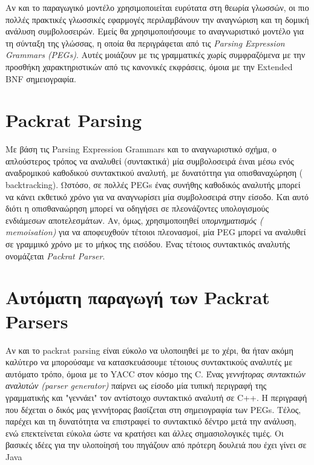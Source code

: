 \documentclass[diploma]{softlab-thesis}
\begin{document}
  Αν και το παραγωγικό μοντέλο χρησιμοποιείται ευρύτατα στη θεωρία γλωσσών, οι πιο πολλές πρακτικές γλωσσικές εφαρμογές περιλαμβάνουν την αναγνώριση και τη δομική ανάλυση συμβολοσειρών. 
Εμείς θα χρησιμοποιήσουμε το αναγνωριστικό μοντέλο για τη σύνταξη της γλώσσας, η οποία θα περιγράφεται από τις  \textit{Parsing Expression Grammars (PEGs)}. Αυτές μοιάζουν με τις γραμματικές χωρίς συμφραζόμενα με την προσθήκη χαρακτηριστικών από τις κανονικές εκφράσεις, όμοια με την  Extended BNF σημειογραφία.

\section{ Packrat Parsing}
Με βάση τις Parsing Expression Grammars και το αναγνωριστικό σχήμα, ο απλούστερος τρόπος να αναλυθεί (συντακτικά) μία συμβολοσειρά έιναι μέσω ενός αναδρομικού καθοδικού συντακτικού αναλυτή, με δυνατόττηα για οπισθαναχώρηση ( backtracking). 
Ωστόσο, σε πολλές  PEGs  ένας συνήθης καθοδικός αναλυτής μπορεί να κάνει εκθετικό χρόνο για να αναγνωρίσει μία συμβολοσειρά στην είσοδο. 
Και αυτό διότι η οπισθαναώρηση μπορεί να οδηγήσει σε πλεονάζοντες υπολογισμούς ενδιάμεσων αποτελεσμάτων.
Αν, όμως, χρησιμοποιηθεί \textit{ υπομνηματισμός ( memoisation)} για να αποφευχθούν τέτοιοι πλεονασμοί, μία  PEG  μπορεί να αναλυθεί σε γραμμικό χρόνο με το μήκος της εισόδου.
Ένας τέτοιος συντακτικός αναλυτής ονομάζεται \textit{Packrat Parser}.

\section{ Αυτόματη παραγωγή των  Packrat Parsers}
Αν και το  packrat parsing είναι εύκολο να υλοποιηθεί με το χέρι, θα ήταν ακόμη καλύτερο να μπορούσαμε να κατασκευάσουμε τέτοιους συντακτικούς αναλυτές με αυτόματο τρόπο, όμοια με το  YACC  στον κόσμο της C. 
Ένας \textit{γεννήτορας συντακτιών αναλυτών (parser generator)} παίρνει ως είσοδο μία τυπική περιγραφή της γραμματικής και "γεννάει" τον αντίστοιχο συντακτικό αναλυτή  σε  C++.
Η περιγραφή που δέχεται ο δικός μας γεννήτορας βασίζεται στη σημειογραφία των  PEGs. 
Τέλος, παρέχει και τη δυνατότητα να επιστραφεί το συντακτικό δέντρο μετά την ανάλυση, ενώ επεκτείνεται εύκολα ώστε να κρατήσει και άλλες σημασιολογικές τιμές.
Οι βασικές ιδέες για την υλοποίησή του πηγάζουν από πρότερη δουλειά που έχει γίνει σε  Java %
\end{document}
